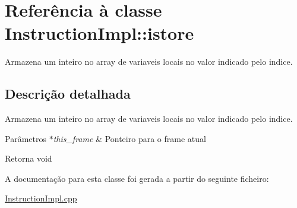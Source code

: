 \hypertarget{class_instruction_impl_1_1istore}{}\section{Referência à classe Instruction\+Impl\+:\+:istore}
\label{class_instruction_impl_1_1istore}


Armazena um inteiro no array de variaveis locais no valor indicado pelo indice.  




\subsection{Descrição detalhada}
Armazena um inteiro no array de variaveis locais no valor indicado pelo indice. 


\begin{DoxyParams}{Parâmetros}
{\em $\ast$this\+\_\+frame} & Ponteiro para o frame atual \\
\hline
\end{DoxyParams}
\begin{DoxyReturn}{Retorna}
void 
\end{DoxyReturn}


A documentação para esta classe foi gerada a partir do seguinte ficheiro\+:\begin{DoxyCompactItemize}
\item 
\hyperlink{_instruction_impl_8cpp}{Instruction\+Impl.\+cpp}\end{DoxyCompactItemize}
